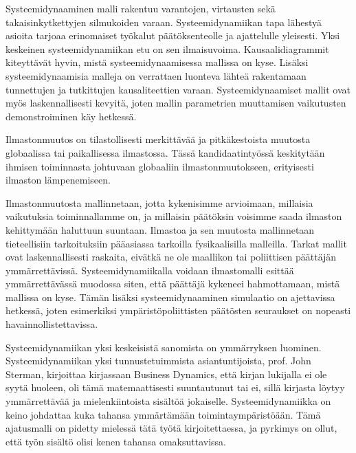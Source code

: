 \documentclass[finnish,12pt,a4paper,pdftex]{article}
\begin{document}
\begin{onehalfspacing}

Systeemidynaaminen malli rakentuu varantojen, virtausten sekä takaisinkytkettyjen silmukoiden varaan. Systeemidynamiikan tapa lähestyä asioita tarjoaa erinomaiset työkalut päätöksenteolle ja ajattelulle yleisesti. Yksi keskeinen systeemidynamiikan etu on sen ilmaisuvoima. Kausaalidiagrammit kiteyttävät hyvin, mistä systeemidynaamisessa mallissa on kyse. Lisäksi systeemidynaamisia malleja on verrattaen luonteva lähteä rakentamaan tunnettujen ja tutkittujen kausaliteettien varaan. Systeemidynaamiset mallit ovat myös laskennallisesti kevyitä, joten mallin parametrien muuttamisen vaikutusten demonstroiminen käy hetkessä.  

Ilmastonmuutos on tilastollisesti merkittävää ja pitkäkestoista muutosta globaalissa tai paikallisessa ilmastossa. Tässä kandidaatintyössä keskitytään ihmisen toiminnasta johtuvaan globaaliin ilmastonmuutokseen, erityisesti ilmaston lämpenemiseen. 

Ilmastonmuutosta mallinnetaan, jotta kykenisimme arvioimaan, millaisia vaikutuksia toiminnallamme on, ja millaisin päätöksin voisimme saada ilmaston kehittymään haluttuun suuntaan. Ilmastoa ja sen muutosta mallinnetaan tieteellisiin tarkoituksiin pääasiassa tarkoilla fysikaalisilla malleilla. Tarkat mallit ovat laskennallisesti raskaita, eivätkä ne ole maallikon tai poliittisen päättäjän ymmärrettävissä. Systeemidynamiikalla voidaan ilmastomalli esittää ymmärrettävässä muodossa siten, että päättäjä kykeneei hahmottamaan, mistä mallissa on kyse. Tämän lisäksi systeemidynaaminen simulaatio on ajettavissa hetkessä, joten esimerkiksi ympäristöpoliittisten päätösten seuraukset on nopeasti havainnollistettavissa. 

Systeemidynamiikan yksi keskeisistä sanomista on ymmärryksen luominen. Systeemidynamiikan yksi tunnustetuimmista asiantuntijoista, prof. John Sterman, kirjoittaa kirjassaan Business Dynamics, että kirjan lukijalla ei ole syytä huoleen, oli tämä matemaattisesti suuntautunut tai ei, sillä kirjasta löytyy ymmärrettävää ja mielenkiintoista sisältöä jokaiselle. Systeemidynamiikka on keino johdattaa kuka tahansa ymmärtämään toimintaympäristöään. Tämä ajatusmalli on pidetty mielessä tätä työtä kirjoitettaessa, ja pyrkimys on ollut, että työn sisältö olisi kenen tahansa omaksuttavissa. 



\end{onehalfspacing}
\end{document}
